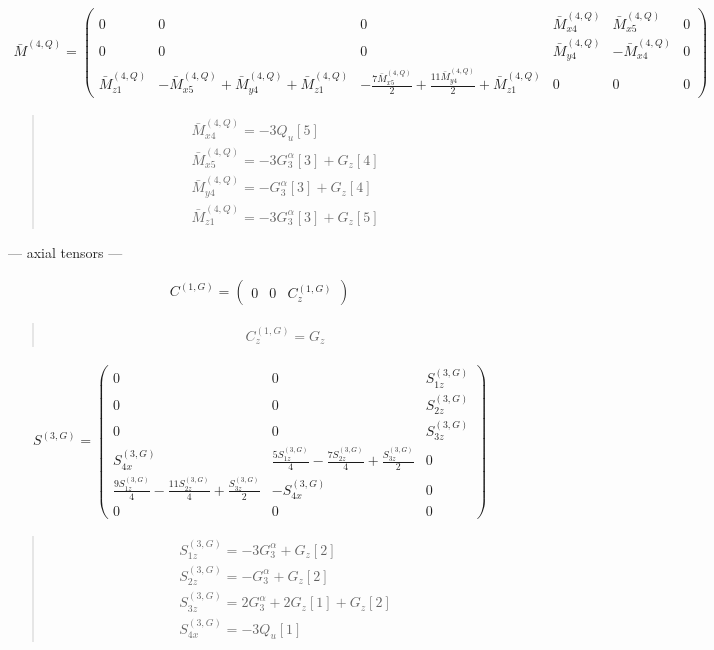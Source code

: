\documentclass[fleqn,10pt]{jsarticle}
\begin{document}
\begin{align*}
\bar{M}^{(4,Q)} = \begin{pmatrix} 0 & 0 & 0 & \bar{M}^{(4,Q)}_{x4} & \bar{M}^{(4,Q)}_{x5} & 0 \\ 0 & 0 & 0 & \bar{M}^{(4,Q)}_{y4} & - \bar{M}^{(4,Q)}_{x4} & 0 \\ \bar{M}^{(4,Q)}_{z1} & - \bar{M}^{(4,Q)}_{x5} + \bar{M}^{(4,Q)}_{y4} + \bar{M}^{(4,Q)}_{z1} & - \frac{7 \bar{M}^{(4,Q)}_{x5}}{2} + \frac{11 \bar{M}^{(4,Q)}_{y4}}{2} + \bar{M}^{(4,Q)}_{z1} & 0 & 0 & 0 \end{pmatrix}
\end{align*}
\begin{quote}
\begin{align*}
& \bar{M}^{(4,Q)}_{x4} = - 3 Q_{u}[5] \\
& \bar{M}^{(4,Q)}_{x5} = - 3 G_{3}^{\alpha}[3] + G_{z}[4] \\
& \bar{M}^{(4,Q)}_{y4} = - G_{3}^{\alpha}[3] + G_{z}[4] \\
& \bar{M}^{(4,Q)}_{z1} = - 3 G_{3}^{\alpha}[3] + G_{z}[5]
\end{align*}
\end{quote}
\newpage
\begin{center}\LARGE --- axial tensors ---\end{center}
\begin{align*}
C^{(1,G)} = \begin{pmatrix} 0 & 0 & C^{(1,G)}_{z} \end{pmatrix}
\end{align*}
\begin{quote}
\begin{align*}
& C^{(1,G)}_{z} = G_{z}
\end{align*}
\end{quote}
\begin{align*}
S^{(3,G)} = \begin{pmatrix} 0 & 0 & S^{(3,G)}_{1z} \\ 0 & 0 & S^{(3,G)}_{2z} \\ 0 & 0 & S^{(3,G)}_{3z} \\ S^{(3,G)}_{4x} & \frac{5 S^{(3,G)}_{1z}}{4} - \frac{7 S^{(3,G)}_{2z}}{4} + \frac{S^{(3,G)}_{3z}}{2} & 0 \\ \frac{9 S^{(3,G)}_{1z}}{4} - \frac{11 S^{(3,G)}_{2z}}{4} + \frac{S^{(3,G)}_{3z}}{2} & - S^{(3,G)}_{4x} & 0 \\ 0 & 0 & 0 \end{pmatrix}
\end{align*}
\begin{quote}
\begin{align*}
& S^{(3,G)}_{1z} = - 3 G_{3}^{\alpha} + G_{z}[2] \\
& S^{(3,G)}_{2z} = - G_{3}^{\alpha} + G_{z}[2] \\
& S^{(3,G)}_{3z} = 2 G_{3}^{\alpha} + 2 G_{z}[1] + G_{z}[2] \\
& S^{(3,G)}_{4x} = - 3 Q_{u}[1]
\end{align*}
\end{quote}
\end{document}
